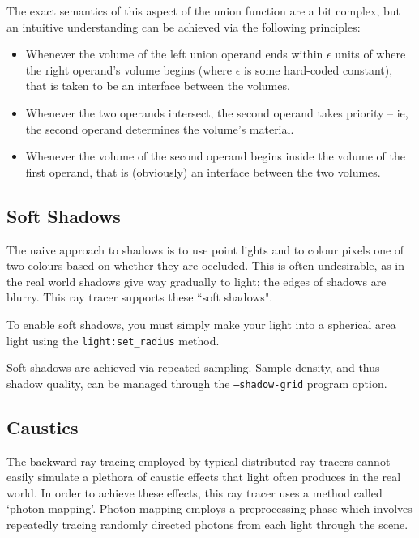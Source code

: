 \documentclass{article}
\begin{document}
The exact semantics of this aspect of the union function are a bit complex, but
an intuitive understanding can be achieved via the following principles:

\begin{itemize}
  \item Whenever the volume of the left union operand ends within $\epsilon$
    units of where the right operand's volume begins (where $\epsilon$ is some
    hard-coded constant), that is taken to be an interface between the volumes.
  \item Whenever the two operands intersect, the second operand takes priority
    -- ie, the second operand determines the volume's material.
  \item Whenever the volume of the second operand begins inside the volume of
    the first operand, that is (obviously) an interface between the two volumes.
\end{itemize}

\subsection{Soft Shadows}
\label{soft_shadows}

The naive approach to shadows is to use point lights and to colour pixels one of
two colours based on whether they are occluded. This is often undesirable, as in
the real world shadows give way gradually to light; the edges of shadows are
blurry. This ray tracer supports these ``soft shadows".

To enable soft shadows, you must simply make your light into a spherical area
light using the {\tt light:set\_radius} method.

Soft shadows are achieved via repeated sampling. Sample density, and thus shadow
quality, can be managed through the {\tt --shadow-grid} program option.

\subsection{Caustics}
\label{caustics}

The backward ray tracing employed by typical distributed ray tracers cannot
easily simulate a plethora of caustic effects that light often produces in the
real world. In order to achieve these effects, this ray tracer uses a method
called `photon mapping'. Photon mapping employs a preprocessing phase which
involves repeatedly tracing randomly directed photons from each light through
the scene.
\end{document}
